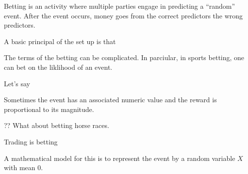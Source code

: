 Betting is an activity where multiple parties engage in predicting a
``random'' event. After the event occurs, money goes from the correct
predictors the wrong predictors.

A basic principal of the set up is that


The terms of the betting can be complicated. In parciular, in sports
betting, one can bet on the liklihood of an event.

Let's say



Sometimes the event has an associated numeric value and the
reward is proportional to its magnitude.





?? What about betting horse races.

Trading is betting

A mathematical model for this is to represent the event by a random
variable $X$ with mean 0.
